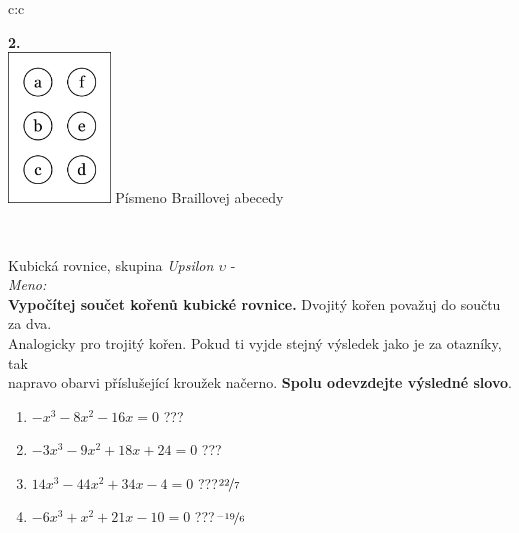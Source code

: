 \documentclass[10pt]{report}
\begin{document}
\begin{tabular}{c:c}
\begin{minipage}[c][99mm][t]{0.49\linewidth}
\begin{center}
\begin{minipage}{0.77\linewidth}
\begin{center}
\begin{varwidth}{\textwidth}
\end{varwidth}
\end{center}
\end{minipage}
\begin{minipage}{0.20\linewidth}
\begin{center}
{\Huge\bfseries 2.} \\[2mm]
\includegraphics[height=40mm]{../images/braille.png}
{\small Písmeno Braillovej abecedy}
\end{center}
\end{minipage}
\end{center}
\end{minipage}
\\ \hdashline
\begin{minipage}[c][99mm][t]{0.49\linewidth}
\begin{center}
\vspace{7mm}
{\huge Kubická rovnice, skupina \textit{Upsilon $\upsilon$} -}\\[4.5mm]
\textit{Meno:}\phantom{xxxxxxxxxxxxxxxxxxxxxxxxxxxxxxxxxxxxxxxxxxxxxxxxxxxxxxxxxxxxxxxxx}\\[3.5mm]
\textbf{Vypočítej součet kořenů kubické rovnice.} Dvojitý kořen považuj do součtu za dva.\\Analogicky pro trojitý kořen. Pokud ti vyjde stejný výsledek jako je za otazníky, tak\\napravo obarvi příslušející kroužek načerno. \textbf{Spolu odevzdejte výsledné slovo}.\\[3mm]
\begin{minipage}{0.77\linewidth}
\begin{center}
\begin{varwidth}{\textwidth}
\begin{enumerate}
\large
\item $-x^3-8x^2-16x=0$\quad \dotfill\; ???\;\dotfill {}
\item $-3x^3-9x^2+18x+24=0$\quad \dotfill\; ???\;\dotfill {}
\item $14x^3-44x^2+34x-4=0$\quad \dotfill\; ???\;\dotfill \quad $\nicefrac{22}{7}$
\item $-6x^3+x^2+21x-10=0$\quad \dotfill\; ???\;\dotfill \quad $\nicefrac{-19}{6}$

\end{enumerate}
\end{varwidth}
\end{center}
\end{minipage}
\end{center}
\end{minipage}
\end{tabular}
\end{document}
